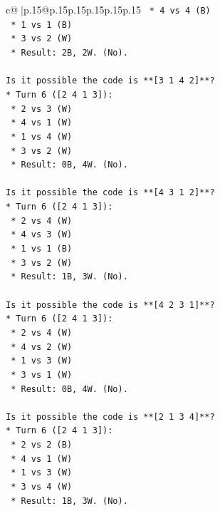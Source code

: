\documentclass{article}
\begin{document}
{\begin{supertabular}{c@{$\;$}|p{.15\linewidth}@{}p{.15\linewidth}p{.15\linewidth}p{.15\linewidth}p{.15\linewidth}p{.15\linewidth}}
{{{\texttt{    *   4 vs 4 (B)} \\
\texttt{    *   1 vs 1 (B)} \\
\texttt{    *   3 vs 2 (W)} \\
\texttt{    *   Result: 2B, 2W. (No).} \\
\\ 
\texttt{Is it possible the code is **{[}3 1 4 2{]}**?} \\
\texttt{*   Turn 6 ({[}2 4 1 3{]}):} \\
\texttt{    *   2 vs 3 (W)} \\
\texttt{    *   4 vs 1 (W)} \\
\texttt{    *   1 vs 4 (W)} \\
\texttt{    *   3 vs 2 (W)} \\
\texttt{    *   Result: 0B, 4W. (No).} \\
\\ 
\texttt{Is it possible the code is **{[}4 3 1 2{]}**?} \\
\texttt{*   Turn 6 ({[}2 4 1 3{]}):} \\
\texttt{    *   2 vs 4 (W)} \\
\texttt{    *   4 vs 3 (W)} \\
\texttt{    *   1 vs 1 (B)} \\
\texttt{    *   3 vs 2 (W)} \\
\texttt{    *   Result: 1B, 3W. (No).} \\
\\ 
\texttt{Is it possible the code is **{[}4 2 3 1{]}**?} \\
\texttt{*   Turn 6 ({[}2 4 1 3{]}):} \\
\texttt{    *   2 vs 4 (W)} \\
\texttt{    *   4 vs 2 (W)} \\
\texttt{    *   1 vs 3 (W)} \\
\texttt{    *   3 vs 1 (W)} \\
\texttt{    *   Result: 0B, 4W. (No).} \\
\\ 
\texttt{Is it possible the code is **{[}2 1 3 4{]}**?} \\
\texttt{*   Turn 6 ({[}2 4 1 3{]}):} \\
\texttt{    *   2 vs 2 (B)} \\
\texttt{    *   4 vs 1 (W)} \\
\texttt{    *   1 vs 3 (W)} \\
\texttt{    *   3 vs 4 (W)} \\
\texttt{    *   Result: 1B, 3W. (No).} \\
}}}
\end{supertabular}}
\end{document}
